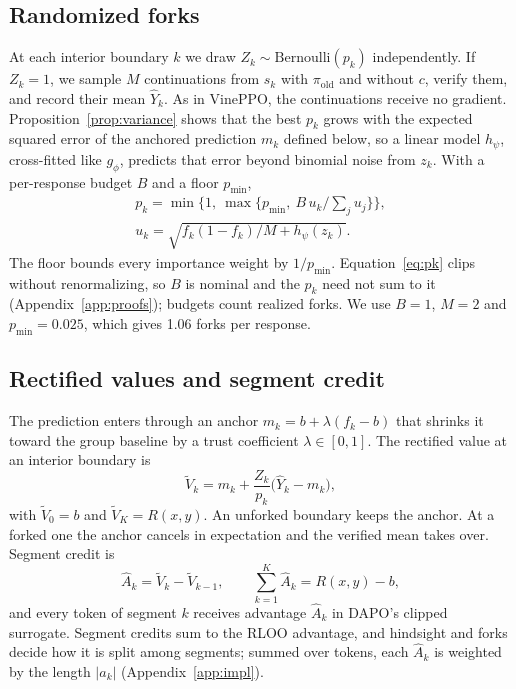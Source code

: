 \documentclass[11pt]{article}
\newcommand{\Vt}{\tilde V}
\newcommand{\Ah}{\hat A}
\newcommand{\Yh}{\hat Y}
\newcommand{\piold}{\pi_{\mathrm{old}}}
\theoremstyle{remark}
\begin{document}
\subsection{Randomized forks}
\label{sec:forks}

At each interior boundary $k$ we draw $Z_k\sim\mathrm{Bernoulli}(p_k)$ independently. If $Z_k=1$, we sample $M$ continuations from $s_k$ with $\piold$ and without $c$, verify them, and record their mean $\Yh_k$. As in VinePPO, the continuations receive no gradient. Proposition~\ref{prop:variance} shows that the best $p_k$ grows with the expected squared error of the anchored prediction $m_k$ defined below, so a linear model $h_\psi$, cross-fitted like $g_\phi$, predicts that error beyond binomial noise from $z_k$. With a per-response budget $B$ and a floor $p_{\min}$,
\begin{equation}
\begin{gathered}
p_k = \min\bigl\{1,\ \max\bigl\{p_{\min},\ B\,u_k/{\textstyle\sum_j} u_j\bigr\}\bigr\},\\
u_k = \sqrt{f_k(1-f_k)/M + h_\psi(z_k)} .
\end{gathered}
\label{eq:pk}
\end{equation}
The floor bounds every importance weight by $1/p_{\min}$. Equation~\eqref{eq:pk} clips without renormalizing, so $B$ is nominal and the $p_k$ need not sum to it (Appendix~\ref{app:proofs}); budgets count realized forks. We use $B=1$, $M=2$ and $p_{\min}=0.025$, which gives 1.06 forks per response.

\subsection{Rectified values and segment credit}
\label{sec:rectify}

The prediction enters through an anchor $m_k=b+\lambda(f_k-b)$ that shrinks it toward the group baseline by a trust coefficient $\lambda\in[0,1]$. The rectified value at an interior boundary is
\begin{equation}
\Vt_k = m_k + \frac{Z_k}{p_k}\bigl(\Yh_k - m_k\bigr),
\label{eq:rectified}
\end{equation}
with $\Vt_0=b$ and $\Vt_K=R(x,y)$. An unforked boundary keeps the anchor. At a forked one the anchor cancels in expectation and the verified mean takes over. Segment credit is
\begin{equation}
\Ah_k = \Vt_k - \Vt_{k-1},\qquad \sum_{k=1}^{K}\Ah_k = R(x,y) - b ,
\label{eq:credit}
\end{equation}
and every token of segment $k$ receives advantage $\Ah_k$ in DAPO's clipped surrogate. Segment credits sum to the RLOO advantage, and hindsight and forks decide how it is split among segments; summed over tokens, each $\Ah_k$ is weighted by the length $|a_k|$ (Appendix~\ref{app:impl}).
\end{document}
